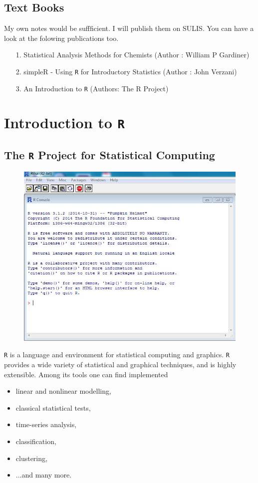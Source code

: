 \documentclass[12pt, a4paper]{article}
\begin{document}
\subsection{Text Books}

\noindent My own notes would be suffficient. I will publish them on SULIS. You can have a look at the folowing publications too.
\begin{itemize}
	\item[1.] Statistical Analysis Methods for Chemists (Author : William P Gardiner)
	\item[2.] simpleR - Using \texttt{R} for Introductory Statistics (Author : John Verzani)
	\item[3.] An Introduction to \texttt{R} (Authors: The R Project)
\end{itemize}

\newpage
\section{Introduction to \texttt{R}}

\subsection{The \texttt{R} Project for Statistical Computing}
\begin{figure}[h!]
\centering
\includegraphics[width=0.60\linewidth]{Rscreenshot}
\end{figure}

\noindent \texttt{R} is a language and environment for statistical computing and graphics. \texttt{R} provides a wide variety of statistical and graphical techniques, and is highly extensible. Among its tools
one can find implemented
\begin{itemize}
	\item linear and nonlinear modelling,
	\item classical statistical tests,
	\item time-series analysis,
	\item classification,
	\item clustering,
	\item ...and many more.
\end{itemize}
\end{document}
